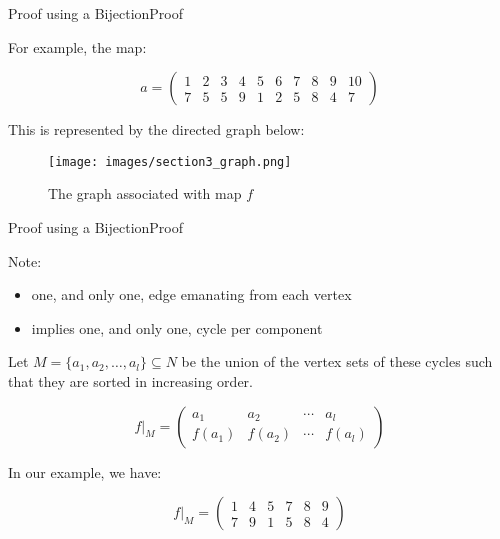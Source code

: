 \documentclass[10pt]{beamer}
\theoremstyle{definition}
\newcommand{\Sthree}{Proof using a Bijection}
\newcommand{\SthreeSSproof}{Proof}
\begin{document}
\begin{frame}{\Sthree}{\SthreeSSproof}

For example, the map:

\[
  a = \left(\begin{matrix}
    1 & 2 & 3 & 4 & 5 & 6 & 7 & 8 & 9 & 10 \\
    7 & 5 & 5 & 9 & 1 & 2 & 5 & 8 & 4 & 7
  \end{matrix}\right)
\]

\pause{}

This is represented by the directed graph below:

\begin{figure}
  \texttt{[image: images/section3\_graph.png]}
  \caption{The graph associated with map $f$}
  \label{fig:section3_graph}
\end{figure}

\end{frame}

\begin{frame}{\Sthree}{\SthreeSSproof}

Note:
\begin{itemize}
  \item one, and only one, edge emanating from each vertex
  \item implies one, and only one, cycle per component 
\end{itemize}

\pause{}

Let $M=\{a_{1}, a_{2}, \ldots, a_{l}\} \subseteq N$ be the union of the vertex sets of these cycles such that they are sorted in increasing order.

\[
  f|_{M} = \left(\begin{matrix}
      a_{1}  &   a_{2}  & \cdots &   a_{l} \\
    f(a_{1}) & f(a_{2}) & \cdots & f(a_{l})
  \end{matrix}\right)
\]

In our example, we have:

\[
  f|_{M} = \left(\begin{matrix}
      1 & 4 & 5 & 7 & 8 & 9 \\
      7 & 9 & 1 & 5 & 8 & 4
  \end{matrix}\right)
\]

\end{frame}
\end{document}
